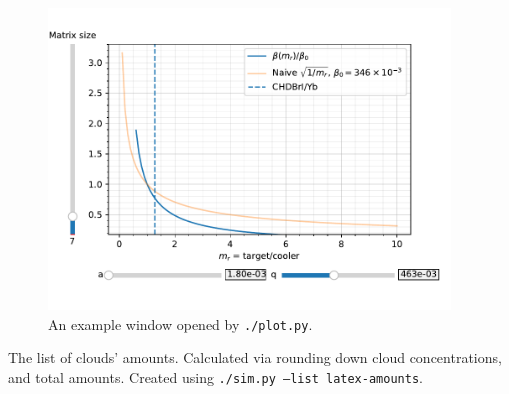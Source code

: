

\begin{figure}
	\begin{center}
		\includegraphics[width=0.95\textwidth]{graphics/software-plot-example.pdf}
	\end{center}
	\caption{An example window opened by \texttt{./plot.py}.}
	\label{fig:software-plot-example}
\end{figure}

\begin{table}

\caption{The list of clouds' amounts. Calculated via rounding down cloud concentrations, and total amounts. Created using \texttt{./sim.py --list latex-amounts}.}
\label{tbl:sim-list-amounts}
\end{table}
\restoregeometry
